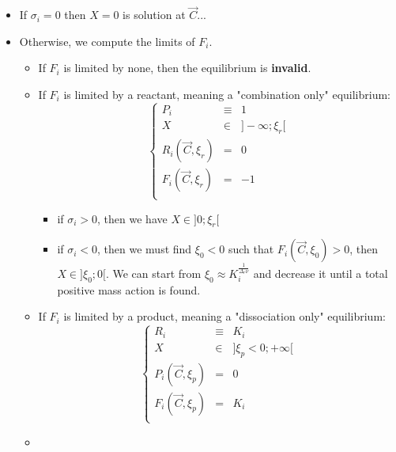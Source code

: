 \documentclass[aps,12pt]{revtex4}
\begin{document}
\begin{itemize}
\item If $\sigma_i=0$ then $X=0$ is solution at $\vec{C}$...
\item Otherwise, we compute the limits of $F_i$.
	
	\begin{itemize}
	\item If $F_i$ is limited by none, then the equilibrium is \textbf{invalid}.

	\item If $F_i$ is limited by a reactant, meaning a "combination only" equilibrium:
		\begin{equation}
		\left\lbrace
			\begin{array}{rcl}
			P_i   & \equiv & 1\\
			X     & \in & \rbrack-\infty;\xi_r\lbrack\\
			R_i(\vec{C},\xi_r)  & = & 0 \\
 			F_i(\vec{C},\xi_r)  & = & -1 \\
			\end{array}
		\right.
		\end{equation}
		\begin{itemize}
		\item if $\sigma_i>0$, then we have $X\in\rbrack 0;\xi_r \lbrack$
		\item if $\sigma_i<0$, then we must find $\xi_0<0$ such that $F_i(\vec{C},\xi_0)>0$,
		then $X\in\rbrack \xi_0;0\lbrack$.
		We can start from $\xi_0 \approx K_i^{\frac{1}{\Delta_r \nu}}$ and decrease it until a total positive mass action is found.
		\end{itemize}
 	\item If $F_i$ is limited by a product, meaning a "dissociation only" equilibrium:
	\begin{equation}
		\left\lbrace
			\begin{array}{rcl}
			R_i   & \equiv & K_i\\
			X     & \in & \rbrack \xi_p<0 ; +\infty \lbrack\\
			P_i(\vec{C},\xi_p)  & = & 0 \\
 			F_i(\vec{C},\xi_p)  & = & K_i \\
			\end{array}
		\right.
		\end{equation}

	
	\item
	\end{itemize}

\end{itemize}
\end{document}
